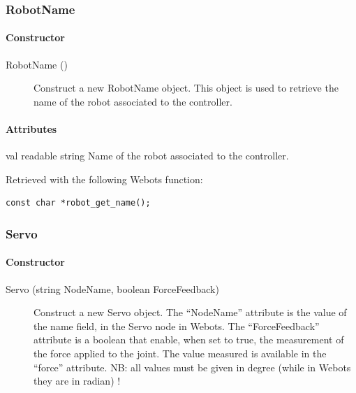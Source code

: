 \subsubsection{RobotName}
\label{webots.uobjects.robotdevices.robotname}%

\paragraph{Constructor}
\label{webots.uobjects.robotdevices.robotname.constructor}%

\noindent
\begin{description}
\item[{RobotName ()}]     Construct a new RobotName object. This object is used to retrieve the name of the
          robot associated to the \urbi controller.

\end{description}

\paragraph{Attributes}
\label{webots.uobjects.robotdevices.robotname.attributes}%

\noindent
\begin{itemize}
\begin{attribute}{val}
  {readable}
  {string}
  {}
  Name of the robot associated to the \urbi controller.


 Retrieved with the following Webots function:


\begin{lstlisting}
const char *robot_get_name();
\end{lstlisting}
\end{attribute}

\end{itemize}

\subsubsection{Servo}
\label{webots.uobjects.robotdevices.servo}%

\paragraph{Constructor}
\label{webots.uobjects.robotdevices.servo.constructor}%

\noindent
\begin{description}
\item[{Servo (string NodeName, boolean ForceFeedback)}] Construct a new Servo object. The ``NodeName'' attribute is the value
          of the name field, in the Servo node in Webots. The ``ForceFeedback'' attribute
          is a boolean that enable, when set to true, the measurement of the force applied
          to the joint. The value measured is available in the ``force'' attribute.
          NB: all values must be given in degree (while in Webots they are in radian) !

\end{description}

